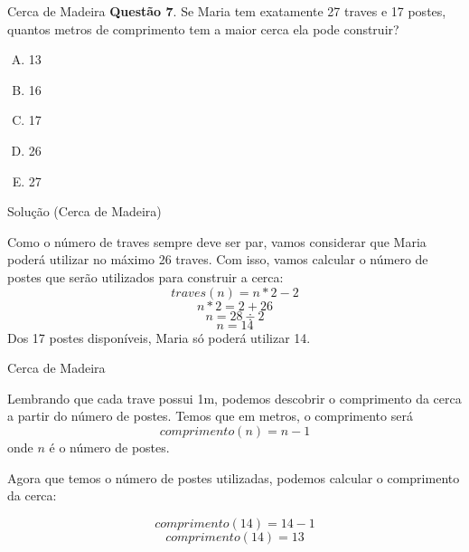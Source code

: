 \documentclass{beamer}
\begin{document}
\begin{frame}{Cerca de Madeira}
\textbf{Questão 7}. Se Maria tem exatamente 27 traves
e 17 postes, quantos metros de comprimento tem
a maior cerca ela pode construir?

\begin{enumerate}[(A)]
    \item 13
    \item 16
    \item 17
    \item 26
    \item 27
\end{enumerate}

\end{frame}
\begin{frame}{Solução (Cerca de Madeira)}

Como o número de traves sempre deve ser par, vamos considerar que Maria poderá utilizar no máximo 26 traves. Com isso, vamos calcular o número de postes que serão utilizados para construir a cerca:
    \begin{equation*}
        traves(n) = n \ast 2 - 2
    \end{equation*}
    \begin{equation*}
       n \ast 2 = 2 + 26 
    \end{equation*}
     \begin{equation*}
       n = 28\div2
    \end{equation*}
     \begin{equation*}
       n = 14
    \end{equation*}
    Dos 17 postes disponíveis, Maria só poderá utilizar 14. 


\end{frame}



\begin{frame}{Cerca de Madeira}

Lembrando que cada trave possui 1m, podemos descobrir o comprimento da cerca a partir do número de postes. Temos que em metros, o comprimento será
\begin{equation*}
    comprimento(n) = n - 1
\end{equation*}
onde $n$ é o número de postes.


Agora que temos o número de postes utilizadas, podemos calcular o comprimento da cerca:


    \begin{equation*}
       comprimento(14) = 14 - 1
    \end{equation*}
    \begin{equation*}
       comprimento(14) = 13  
    \end{equation*}
     
\end{frame}
\end{document}
